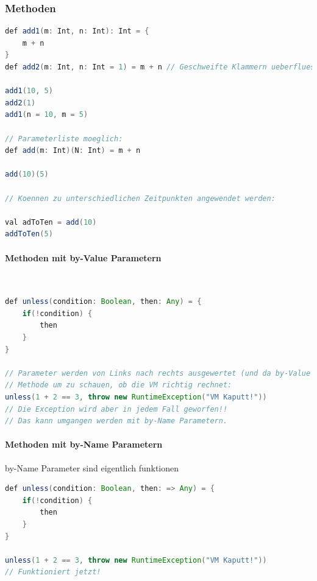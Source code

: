 \subsubsection{Methoden}

\begin{lstlisting}[language=java]
def add1(m: Int, n: Int): Int = {
	m + n
}
def add2(m: Int, n: Int = 1) = m + n // Geschweifte Klammern ueberfluessig bei einzelner Expression

add1(10, 5)
add2(1)
add1(n = 10, m = 5)

// Parameterliste moeglich:
def add(m: Int)(N: Int) = m + n

add(10)(5)

// Koennen zu unterschiedlichen Zeitpunkten angewendet werden:

val adToTen = add(10)
addToTen(5)
\end{lstlisting}

\paragraph{Methoden mit by-Value Parametern} \hfill \\

\begin{lstlisting}[language=java]
def unless(condition: Boolean, then: Any) = {
	if(!condition) {
		then
	}
}

// Parameter werden von Links nach rechts ausgewertet (und da by-Value zuerst evaluiert.)
// Methode um zu schauen, ob die VM richtig rechnet:
unless(1 + 2 == 3, throw new RuntimeException("VM Kaputt!"))
// Die Exception wird aber in jedem Fall geworfen!!
// Das kann umgangen werden mit by-Name Parametern.

\end{lstlisting}

\paragraph{Methoden mit by-Name Parametern}

by-Name Parameter sind eigentlich funktionen %

\begin{lstlisting}[language=java]
def unless(condition: Boolean, then: => Any) = {
	if(!condition) {
		then
	}
}

unless(1 + 2 == 3, throw new RuntimeException("VM Kaputt!"))
// Funktioniert jetzt!
\end{lstlisting}

